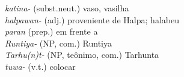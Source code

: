 
\noindent \emph{katina-} (subst.neut.) vaso, vasilha\\
\emph{halpawan-} (adj.) proveniente de Halpa; halabeu\\
\emph{paran} (prep.) em frente a\\
\emph{Runtiya-} (NP, com.) Runtiya\\
\emph{Tarhu{(n)}t-} (NP, teônimo, com.) Tarhunta\\
\emph{tuwa-} (v.t.) colocar
